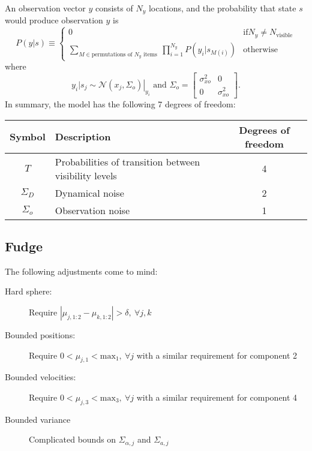 \documentclass[12pt]{article}
\newcommand{\NormalE}[3]{{\mathcal{N}}\left.\left(#1,#2\right)\right|_{#3}}
\begin{document}
An observation vector $y$ consists of $N_y$ locations, and the
probability that state $s$ would produce observation $y$ is
\begin{equation*}
  P(y|s) \equiv
  \begin{cases}
    0 & \text{if} N_y \neq N_{\text{visible}} \\
    \sum_{M \in \text{permutations of }N_y\text{ items }}
    \prod_{i=1}^{N_y} P(y_i|s_{M(i)}) & \text{otherwise}
  \end{cases}
\end{equation*}
where
\begin{equation*}
  y_i|s_j \sim \NormalE{x_j}{\Sigma_o}{y_i} \text{ and }
  \Sigma_o = \begin{bmatrix} \sigma_{xo}^2 & 0 \\ 0 &
    \sigma_{xo}^2 \end{bmatrix}.
\end{equation*}
In summary, the model has the following 7 degrees of freedom:
\begin{center}
  \begin{tabular}{|cp{15em}c|}
    \hline
    Symbol & Description & Degrees of freedom \\
    \hline
    $T$ & Probabilities of transition between visibility levels & 4 \\
    $\Sigma_D$ & Dynamical noise & 2 \\
    $\Sigma_o$ & Observation noise & 1 \\
    \hline
  \end{tabular} 
\end{center}

\subsection{Fudge}
\label{sec:fudge}

The following adjustments come to mind:
\begin{description}
\item[Hard sphere:] Require $\left|\mu_{j,1:2} - \mu_{k,1:2} \right| >
  \delta,~\forall j,k$
\item[Bounded positions:] Require $0 < \mu_{j,1} <
  \text{max}_1,~\forall j$ with a similar requirement for component 2
\item[Bounded velocities:] Require $0 < \mu_{j,3} <
  \text{max}_3,~\forall j$ with a similar requirement for component 4
\item[Bounded variance] Complicated bounds on $\Sigma_{\alpha,j}$ and
  $\Sigma_{a,j}$
\end{description}
\end{document}
